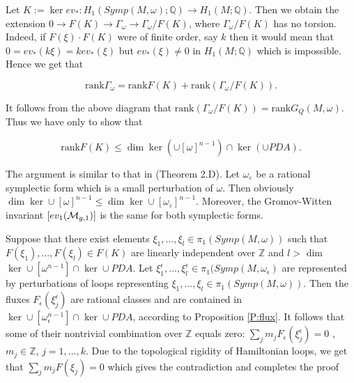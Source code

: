 \documentclass[a4paper,14pt]{article}
\newcommand{\B}[1]{\mathbb #1}
\newcommand{\C}[1]{{\cal #1}}
\newcommand{\om}{{\omega}}
\newcommand{\eps}{{\varepsilon}}
\newcommand{\Ga}{{\Gamma}}
\newcommand{\qed}{\rightline {$\Box $}}
\newcommand{\Mo}{(M,\omega )}
\newcommand{\pis}{\pi _1(Symp\Mo )}
\newcommand{\BS}{{\bigskip}}
\newcommand{\NI}{{\noindent}}
\numberwithin{equation}{section}
\begin{document}
\BS

\noindent
Let $K:=\ker ev_*:H_1(Symp\Mo ;\B Q)\to H_1(M;\B Q)$. Then
we obtain the extension 
$0\to F(K)\to \Ga _{\om }\to \Ga _{\om }\slash F(K)$,
where $\Ga _{\om }\slash F(K)$ has no torsion. Indeed,
if $F(\xi )\cdot F(K)$ were of finite order, say $k$ then it would mean
that $0=ev_*(k\xi )=kev_*(\xi )$ but $ev_*(\xi )\neq 0$ in 
$H_1(M;\B Q)$ which is impossible. Hence we get that 

$$\text {rank} \Ga _{\om } = 
\text {rank} F(K) + \text {rank} (\Ga _{\om }\slash F(K)).$$

\NI
It follows from the above diagram that
$\text {rank} (\Ga _{\om }\slash F(K))=\text {rank} G_Q\Mo .$ Thus we have only
to show that 

$$\text {rank} F(K) \leq 
\dim \ker (\cup [\om ]^{n-1}) \cap \ker (\cup PDA).$$

\NI
The argument is similar to that in \cite{lmp2} (Theorem 2.D). 
Let $\om _{\eps }$ be a rational symplectic form which is
a small perturbation of $\om $. Then obviously
$\dim \ker \cup [\om]^{n-1}\leq \dim \ker \cup [\om _{\eps }]^{n-1}.$
Moreover, the Gromov-Witten invariant $[ev_1(\C M_{g,1})]$ is
the same for both symplectic forms.

Suppose that there exist elements $\xi _1,...,\xi _l \in \pis$
such that $F(\xi _1),..., F(\xi _l) \in F(K)$
are linearly independent over $\B Z$ and
$l>$ dim $\ker\cup [\om ^{n-1}]\cap \ker \cup PDA$.
Let
$\xi _1^{\epsilon },...,\xi _l^{\epsilon }\in \pi _1(Symp(M,\om _\epsilon )$
are represented by  perturbations of loops representing
$\xi _1,...,\xi _l \in \pis$.
Then the fluxes
$F_{\epsilon }(\xi _j^{\epsilon })$
are rational classes and
are contained in
$\ker\cup[\om _\epsilon ^{n-1}] \cap \ker \cup PDA$, 
according to Proposition \ref{P:flux}.
It follows that some of their
nontrivial combination over $\B Z$ equals zero:
$\sum _j m_jF_{\epsilon }(\xi _j^{\epsilon })=0$
, $m_j\in \B Z$, $j=1,...,k$.
Due to the topological rigidity of Hamiltonian loops, we get that
$\sum _j m_j F(\xi _j)=0$
which gives the contradiction and completes the proof

\qed
\end{document}
